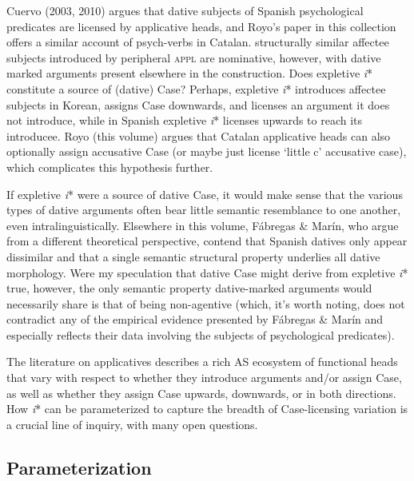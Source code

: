 \documentclass[output=paper]{langscibook}
\begin{document}
Cuervo (2003, 2010) argues that dative subjects of Spanish psychological predicates are licensed by applicative heads, and Royo’s paper in this collection offers a similar account of psych-verbs in Catalan.  structurally similar affectee subjects introduced by peripheral \textsc{appl} are nominative, however, with dative marked arguments present elsewhere in the construction. Does expletive \textit{i}* constitute a source of (dative) Case? Perhaps, expletive \textit{i}* introduces affectee subjects in Korean, assigns Case downwards, and licenses an argument it does not introduce, while in Spanish expletive \textit{i}* licenses upwards to reach its introducee. Royo (this volume) argues that Catalan applicative heads can also optionally assign accusative Case (or maybe just license ‘little c’ accusative case), which complicates this hypothesis further. 



If expletive \textit{i}* were a source of dative Case, it would make sense that the various types of dative arguments often bear little semantic resemblance to one another, even intralinguistically. Elsewhere in this volume, Fábregas \& Marín, who argue from a different theoretical perspective, contend that Spanish datives only appear dissimilar and that a single semantic structural property underlies all dative morphology. Were my speculation that dative Case might derive from expletive \textit{i}* true, however, the only semantic property dative-marked arguments would necessarily share is that of being non-agentive (which, it’s worth noting, does not contradict any of the empirical evidence presented by Fábregas \& Marín and especially reflects their data involving the subjects of psychological predicates). 



The literature on applicatives describes a rich AS ecosystem of functional heads that vary with respect to whether they introduce arguments and/or assign Case, as well as whether they assign Case upwards, downwards, or in both directions. How \textit{i}* can be parameterized to capture the breadth of Case-licensing variation is a crucial line of inquiry, with many open questions.

\subsection{Parameterization}\label{sec:wechsler:4.3}
\end{document}
